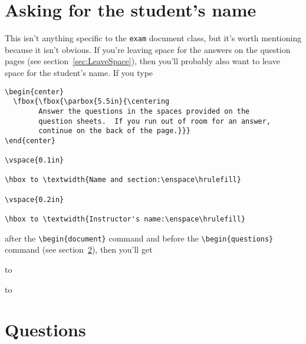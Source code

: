 \documentclass[12pt]{exam}
\begin{document}
\section{Asking for the student's name}

This isn't anything specific to the \verb"exam" document class, but
it's worth mentioning because it isn't obvious.  If you're leaving
space for the answers on the question pages (see
section~\ref{sec:LeaveSpace}), then you'll probably also want to leave
space for the student's name.  If you type
%
\begin{verbatim}
\begin{center}
  \fbox{\fbox{\parbox{5.5in}{\centering
        Answer the questions in the spaces provided on the
        question sheets.  If you run out of room for an answer,
        continue on the back of the page.}}}
\end{center}

\vspace{0.1in}

\hbox to \textwidth{Name and section:\enspace\hrulefill}

\vspace{0.2in}

\hbox to \textwidth{Instructor's name:\enspace\hrulefill}
\end{verbatim}
%
after the \verb"\begin{document}" command and before the
\verb"\begin{questions}" command (see section~\ref{sec:Questions}),
then you'll get\\
\noindent
\parbox{\textwidth}{
\begin{center}
\end{center}

\vspace{0.1in}

\hbox to \textwidth{Name and section:\enspace\hrulefill}

\vspace{0.2in}

\hbox to \textwidth{Instructor's name:\enspace\hrulefill}
}


\section{Questions}
\label{sec:Questions}
\end{document}
